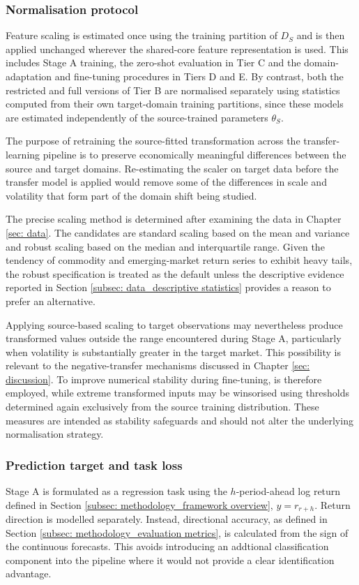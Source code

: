\subsubsection{Normalisation protocol} \label{subsubsec: methodology_stage a_normalisation protocol}
Feature scaling is estimated once using the training partition of $D_S$ and is then applied unchanged wherever the shared-core feature representation is used. This includes Stage A training, the zero-shot evaluation in Tier C and the domain-adaptation and fine-tuning procedures in Tiers D and E. By contrast, both the restricted and full versions of Tier B are normalised separately using statistics computed from their own target-domain training partitions, since these models are estimated independently of the source-trained parameters $\theta_S$.

The purpose of retraining the source-fitted transformation across the transfer-learning pipeline is to preserve economically meaningful differences between the source and target domains. Re-estimating the scaler on target data before the transfer model is applied would remove some of the differences in scale and volatility that form part of the domain shift being studied. 

The precise scaling method is determined after examining the data in Chapter \ref{sec: data}. The candidates are standard scaling based on the mean and variance and robust scaling based on the median and interquartile range. Given the tendency of commodity and emerging-market return series to exhibit heavy tails, the robust specification is treated as the default unless the descriptive evidence reported in Section \ref{subsec: data_descriptive statistics} provides a reason to prefer an alternative.

Applying source-based scaling to target observations may nevertheless produce transformed values outside the range encountered during Stage A, particularly when volatility is substantially greater in the target market. This possibility is relevant to the negative-transfer mechanisms discussed in Chapter \ref{sec: discussion}. To improve numerical stability during fine-tuning,  is therefore employed, while extreme transformed inputs may be winsorised using thresholds determined again exclusively from the source training distribution. These measures are intended as stability safeguards and should not alter the underlying normalisation strategy.

\subsubsection{Prediction target and task loss} \label{subsubsec: methodology_stage a_prediction target and task loss}
Stage A is formulated as a regression task using the $h$-period-ahead log return defined in Section \ref{subsec: methodology_framework overview}, $y=r_{r+h}$. Return direction is  modelled separately. Instead, directional accuracy, as defined in Section \ref{subsec: methodology_evaluation metrics}, is calculated from the sign of the continuous forecasts. This avoids introducing an addtional classification component into the pipeline where it would not provide a clear identification advantage. 

